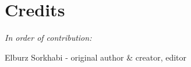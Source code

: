 \cleardoublepage
\chapter{Credits}
\label{ch:14}


\begin{fullwidth}

\textit{In order of contribution:}

Elburz Sorkhabi - original author \& creator, editor

\end{fullwidth}


